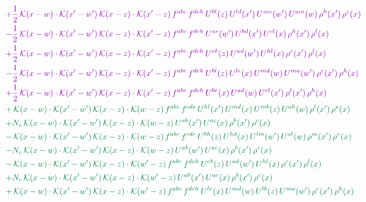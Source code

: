 \documentclass[10pt]{article}
\numberwithin{equation}{section}
\begin{document}
\begin{align}
&{\color{CC} +\frac{1}{2}\,\mathcal{K}(x-w)\cdot\mathcal{K}(x'-w')\,\mathcal{K}(x-z)\cdot\mathcal{K}(x'-z)\,f^{abc}\,f^{deh}\,U^{bl}(z)\,U^{ld}(x')\,U^{me}(w')\,U^{am}(w)\,\rho^{h}(x')\,\rho^{c}(x)} \notag\\
&{\color{CC} -\frac{1}{2}\,\mathcal{K}(x-w)\cdot\mathcal{K}(x'-w')\,\mathcal{K}(x-z)\cdot\mathcal{K}(x'-z)\,f^{abc}\,f^{deh}\,U^{ae}(w')\,U^{bd}(x')\,U^{cl}(x)\,\rho^{h}(x')\,\rho^{l}(x)} \notag\\
&{\color{CC} +\frac{1}{2}\,\mathcal{K}(x-w)\cdot\mathcal{K}(x'-w')\,\mathcal{K}(x-z)\cdot\mathcal{K}(x'-z)\,f^{abc}\,f^{deh}\,U^{eb}(z)\,U^{ad}(w')\,U^{hl}(x)\,\rho^{c}(x')\,\rho^{l}(x)} \notag\\
&{\color{CC} -\frac{1}{2}\,\mathcal{K}(x-w)\cdot\mathcal{K}(x'-w')\,\mathcal{K}(x-z)\cdot\mathcal{K}(x'-z)\,f^{abc}\,f^{deh}\,U^{bl}(z)\,U^{le}(x)\,U^{md}(w)\,U^{ma}(w')\,\rho^{c}(x')\,\rho^{h}(x)} \notag\\
&{\color{CC} +\frac{1}{2}\,\mathcal{K}(x-w)\cdot\mathcal{K}(x'-w')\,\mathcal{K}(x-z)\cdot\mathcal{K}(x'-z)\,f^{abc}\,f^{deh}\,U^{be}(x)\,U^{ad}(w)\,U^{cl}(x')\,\rho^{l}(x')\,\rho^{h}(x)} \notag\\
&{\color{JIM} +\,\mathcal{K}(x-w)\cdot\mathcal{K}(x'-w')\,\mathcal{K}(x-z)\cdot\mathcal{K}(w-z)\,f^{abc}\,f^{cde}\,U^{hl}(x')\,U^{md}(x)\,U^{mb}(z)\,U^{ah}(w)\,\rho^{l}(x')\,\rho^{e}(x)} \notag\\
&{\color{JIM} +N_{c}\,\mathcal{K}(x-w)\cdot\mathcal{K}(x'-w')\,\mathcal{K}(x-z)\cdot\mathcal{K}(w-z)\,U^{ab}(x')\,U^{ac}(x)\,\rho^{b}(x')\,\rho^{c}(x)} \notag\\
&{\color{JIM} -\,\mathcal{K}(x-w)\cdot\mathcal{K}(x'-w')\,\mathcal{K}(x-z)\cdot\mathcal{K}(w-z)\,f^{abc}\,f^{cde}\,U^{bh}(z)\,U^{hd}(x)\,U^{lm}(w')\,U^{al}(w)\,\rho^{m}(x')\,\rho^{e}(x)} \notag\\
&{\color{JIM} -N_{c}\,\mathcal{K}(x-w)\cdot\mathcal{K}(x'-w')\,\mathcal{K}(x-z)\cdot\mathcal{K}(w-z)\,U^{ab}(w')\,U^{ac}(x)\,\rho^{b}(x')\,\rho^{c}(x)} \notag\\
&{\color{JIM} -\,\mathcal{K}(x-w)\cdot\mathcal{K}(x'-w')\,\mathcal{K}(x-z)\cdot\mathcal{K}(w'-z)\,f^{abc}\,f^{deh}\,U^{eb}(z)\,U^{ad}(w')\,U^{hl}(x)\,\rho^{c}(x')\,\rho^{l}(x)} \notag\\
&{\color{JIM} +N_{c}\,\mathcal{K}(x-w)\cdot\mathcal{K}(x'-w')\,\mathcal{K}(x-z)\cdot\mathcal{K}(w'-z)\,U^{ab}(x')\,U^{ac}(x)\,\rho^{b}(x')\,\rho^{c}(x)} \notag\\
&{\color{JIM} +\,\mathcal{K}(x-w)\cdot\mathcal{K}(x'-w')\,\mathcal{K}(x-z)\cdot\mathcal{K}(w'-z)\,f^{abc}\,f^{deh}\,U^{le}(x)\,U^{md}(w)\,U^{lb}(z)\,U^{ma}(w')\,\rho^{c}(x')\,\rho^{h}(x)} \notag\\

\end{align}
\end{document}
